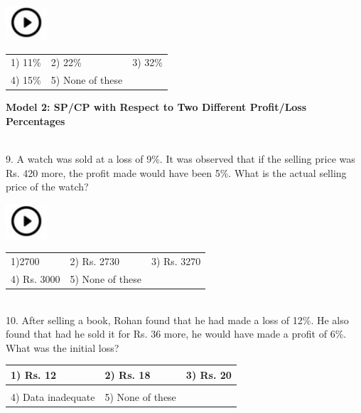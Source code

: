 \documentclass{article}
\begin{document}
	\noindent \includegraphics*[width=0.60in, height=0.52in]{images/image1}
	\begin{tabular}{p{1.7in} p{1.6in} p{1.6in}} \\ 
 1) 11\%                    & 2) 22\%              & 3) 32\%              \\
4) 15\%              & 5) None of these \\
\end{tabular}
	
	\noindent 
	
	\noindent 
	
	\noindent 
	
	\noindent \textbf{Model 2: SP/CP with Respect to Two Different Profit/Loss Percentages}
	
	\noindent 
	
	\noindent  \\ 9.   A watch was sold at a loss of 9\%. It was observed that if the selling price was Rs. 420 more, the profit made would have been 5\%. What is the actual selling price of the watch?
	
	\noindent \includegraphics*[width=0.60in, height=0.52in]{images/image1}
	\begin{tabular}{p{1.7in} p{1.6in} p{1.6in}} \\ 
	1)2700                 & 2) Rs. 2730          & 3) Rs. 3270          \\
4) Rs. 3000                       & 5) None of these \\
\end{tabular}
	
	\noindent 
	
	\noindent 
	
	\noindent  \\ 10. After selling a book, Rohan found that he had made a loss of 12\%. He also found that had he sold it for Rs. 36 more, he would have made a profit of 6\%. What was the initial loss?
	
	\noindent 
	
	\begin{tabular}{|p{1.9in}|p{1.5in}|p{0.6in}|} \hline 

 1) Rs. 12  & 2) Rs. 18 & 3) Rs. 20 \\ \hline 
		\\
4) Data inadequate  & 5) None of these &  \\ \hline 
	\end{tabular}
	
\end{document}
